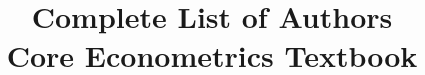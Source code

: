 \documentclass[nohyper]{external/tufte-handout}
\title{Complete List of Authors \\
       Core Econometrics Textbook}
\begin{document}
\maketitle
\bigskip

\end{document}
